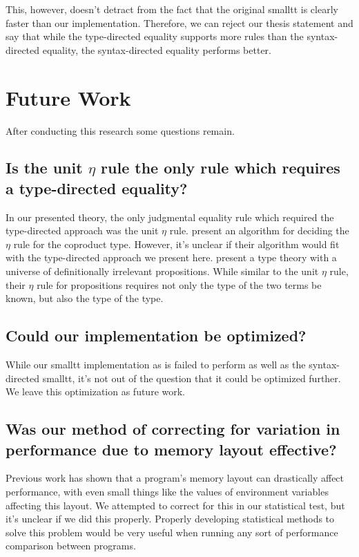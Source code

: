\documentclass[sigplan]{acmart}
\begin{document}
This, however, doesn't detract from the fact that the original smalltt is clearly faster than our implementation.
Therefore, we can reject our thesis statement and say that while the type-directed equality supports more rules than the syntax-directed equality, the syntax-directed equality performs better.

\section{Future Work}

After conducting this research some questions remain.

\subsection{Is the unit $\eta$ rule the only rule which requires a type-directed equality?}

In our presented theory, the only judgmental equality rule which required the type-directed approach was the unit $\eta$ rule.
\citet{altenkirch2001} present an algorithm for deciding the $\eta$ rule for the coproduct type.
However, it's unclear if their algorithm would fit with the type-directed approach we present here.
\citet{gilbert2019} present a type theory with a universe of definitionally irrelevant propositions.
While similar to the unit $\eta$ rule, their $\eta$ rule for propositions requires not only the type of the two terms be known, but also the type of the type.

\subsection{Could our implementation be optimized?}

While our smalltt implementation as is failed to perform as well as the syntax-directed smalltt, it's not out of the question that it could be optimized further.
We leave this optimization as future work.

\subsection{Was our method of correcting for variation in performance due to memory layout effective?}

Previous work has shown that a program's memory layout can drastically affect performance, with even small things like the values of environment variables affecting this layout.
We attempted to correct for this in our statistical test, but it's unclear if we did this properly.
Properly developing statistical methods to solve this problem would be very useful when running any sort of performance comparison between programs.

\newpage


\end{document}
